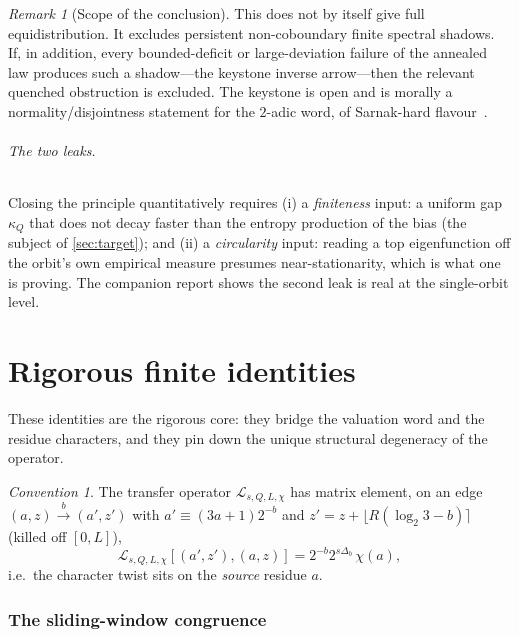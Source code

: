 \documentclass[11pt]{article}
\newcommand{\Lcal}{\mathcal{L}}
\theoremstyle{plain}
\theoremstyle{definition}
\theoremstyle{remark}
\newtheorem*{remark}{Remark}
\newtheorem*{convention}{Convention}
\begin{document}
\begin{remark}[Scope of the conclusion]
This does not by itself give full equidistribution. It excludes persistent
non-coboundary finite spectral shadows. If, in addition, every bounded-deficit or
large-deviation failure of the annealed law produces such a shadow---the keystone
inverse arrow---then the relevant quenched obstruction is excluded. The keystone
is open and is morally a normality/disjointness statement for the $2$-adic word,
of Sarnak-hard flavour~\cite{sarnak2011}.
\end{remark}

\paragraph{The two leaks.} Closing the principle quantitatively requires (i) a
\emph{finiteness} input: a uniform gap $\kappa_Q$ that does not decay faster than
the entropy production of the bias (the subject of \cref{sec:target}); and (ii) a
\emph{circularity} input: reading a top eigenfunction off the orbit's own
empirical measure presumes near-stationarity, which is what one is proving. The
companion report shows the second leak is real at the single-orbit level.

\part{Rigorous finite identities}
\label{sec:identities}

These identities are the rigorous core: they bridge the valuation word and the
residue characters, and they pin down the unique structural degeneracy of the
operator.

\begin{convention}\label{conv:twist}
The transfer operator $\Lcal_{s,Q,L,\chi}$ has matrix element, on an edge
$(a,z)\xrightarrow{b}(a',z')$ with $a'\equiv(3a+1)2^{-b}$ and
$z'=z+\lfloor R(\log_2 3-b)\rceil$ (killed off $[0,L]$),
\[
\Lcal_{s,Q,L,\chi}[(a',z'),(a,z)]=2^{-b}2^{s\Delta_b}\,\chi(a),
\]
i.e.\ the character twist sits on the \emph{source} residue $a$.
\end{convention}

\section{The sliding-window congruence}
\end{document}
